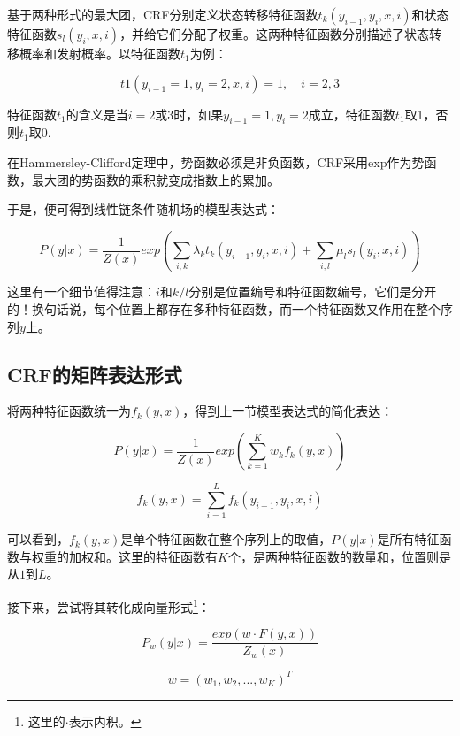 \documentclass[]{article}
\begin{document}
基于两种形式的最大团，CRF分别定义状态转移特征函数$t_k(y_{i-1}, y_i, x, i)$和状态特征函数$s_l(y_i, x, i)$，并给它们分配了权重。这两种特征函数分别描述了状态转移概率和发射概率。以特征函数$t_1$为例：

\begin{equation}\label{key}
	t1(y_{i-1}=1, y_i=2, x, i) = 1, \quad i=2, 3
\end{equation}

特征函数$t_1$的含义是当$i=2$或$3$时，如果$y_{i-1}=1, y_{i}=2$成立，特征函数$t_1$取1，否则$t_1$取0.

在Hammersley-Clifford定理中，势函数必须是非负函数，CRF采用exp作为势函数，最大团的势函数的乘积就变成指数上的累加。

于是，便可得到线性链条件随机场的模型表达式：

\begin{equation}\label{key}
	P(y|x) = \frac{1}{Z(x)}exp(\sum_{i,k}\lambda_k t_k(y_{i-1}, y_i, x, i) + \sum_{i, l}\mu_l s_l(y_i, x, i))
\end{equation}

这里有一个细节值得注意：$i$和$k/l$分别是位置编号和特征函数编号，它们是分开的！换句话说，每个位置上都存在多种特征函数，而一个特征函数又作用在整个序列$y$上。

\subsection{CRF的矩阵表达形式}

将两种特征函数统一为$f_k(y, x)$，得到上一节模型表达式的简化表达：

\begin{equation}\label{key}
	P(y|x) = \frac{1}{Z(x)}exp(\sum_{k=1}^K w_kf_k(y, x))
\end{equation}

\begin{equation}\label{key}
	f_k(y, x) = \sum_{i=1}^L f_k(y_{i-1}, y_i, x, i)
\end{equation}

可以看到，$f_k(y, x)$是单个特征函数在整个序列上的取值，$P(y|x)$是所有特征函数与权重的加权和。这里的特征函数有$K$个，是两种特征函数的数量和，位置则是从$1$到$L$。

接下来，尝试将其转化成向量形式\footnote{这里的$\cdot$表示内积。}：

\begin{equation}\label{key}
	P_w(y|x) = \frac{exp(w \cdot F(y, x))}{Z_w(x)}
\end{equation}

\begin{equation}\label{key}
	w = (w_1, w_2, ..., w_K)^T
\end{equation}
\end{document}
